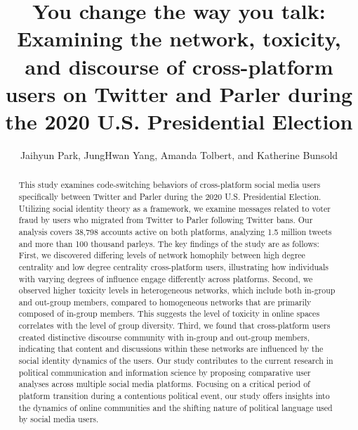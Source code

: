 \documentclass[Crown,sagev,times]{sagej}
\begin{document}
\title{You change the way you talk:
Examining the network, toxicity, and discourse
of cross-platform users on Twitter and Parler
during the 2020 U.S. Presidential Election}

\author{Jaihyun Park, JungHwan Yang, Amanda Tolbert, and Katherine Bunsold}

\begin{abstract}
This study examines code-switching behaviors of cross-platform social media users specifically between Twitter and Parler
during the 2020 U.S. Presidential Election. Utilizing social identity theory as a framework, we examine messages related to voter fraud by 
users who migrated from Twitter to Parler following Twitter bans. Our analysis covers 38,798 accounts active on both platforms, 
analyzing 1.5 million tweets and more than 100 thousand parleys. The key findings of the study are as follows: 
First, we discovered differing levels of network homophily between high degree centrality and low degree centrality cross-platform users, 
illustrating how individuals with varying degrees of influence engage differently across platforms. Second, we observed higher toxicity levels 
in heterogeneous networks, which include both in-group and out-group members, compared to homogeneous networks that are primarily composed of in-group members. 
This suggests the level of toxicity in online spaces correlates with the level of group diversity. 
Third, we found that cross-platform users created distinctive discourse community with in-group and out-group members, 
indicating that content and discussions within these networks are influenced by the social identity dynamics of the users. 
Our study contributes to the current research in political communication and information science by proposing comparative user analyses across multiple social media platforms. 
Focusing on a critical period of platform transition during a contentious political event, our study offers insights into the dynamics of online communities 
and the shifting nature of political language used by social media users.
\end{abstract}


\maketitle
\end{document}
